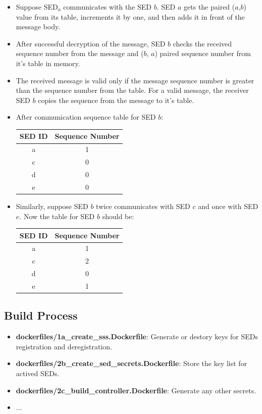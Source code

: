 \documentclass[11pt,oneside,onecolumn,letterpaper]{article}
\begin{document}
\begin{itemize}
  \item Suppose SED$_a$ communicates with the SED $b$. SED $a$ gets the 
  paired ($a$,$b$) value from its table, increments it by one, and then adds it in front of the message body. 
  \item After successful decryption of the message, SED $b$ checks the received sequence number from the message and ($b$, $a$) paired sequence number from it's table in memory.
  \item The received message is valid only if the message sequence number is greater than the sequence number from the table. For a valid message, the receiver SED $b$ copies the sequence from the message to it's table.
  \item After communication sequence table for SED $b$:
    \begin{center}
  \begin{tabular}{ |c|c| } 
   \hline
  \textbf{SED ID} & \textbf{Sequence Number} \\
 	\hline \hline
 	a & 1 \\ 
	c & 0  \\ 
 	d & 0 \\ 
 	e & 0 \\ 
	 \hline
\end{tabular}
\end{center}
\item Similarly, suppose SED $b$ twice communicates with SED $c$ and once with SED $e$. Now the table for SED $b$ should be:
   \begin{center}
  \begin{tabular}{ |c|c| } 
   \hline
  \textbf{SED ID} & \textbf{Sequence Number} \\
 	\hline \hline
 	a & 1 \\ 
	c & 2  \\ 
 	d & 0 \\ 
 	e & 1 \\ 
	 \hline
\end{tabular}
\end{center}
    \end{itemize}


\subsection{Build Process}

  \begin{itemize}
    \item \textbf{dockerfiles/1a\_create\_sss.Dockerfile}: Generate or destory keys for SEDs registration and deregistration.
    \item \textbf{dockerfiles/2b\_create\_sed\_secrets.Dockerfile}: Store the key list for actived SEDs.
    \item \textbf{dockerfiles/2c\_build\_controller.Dockerfile}: Generate any other secrets.
    \item ...
  \end{itemize}
\end{document}
